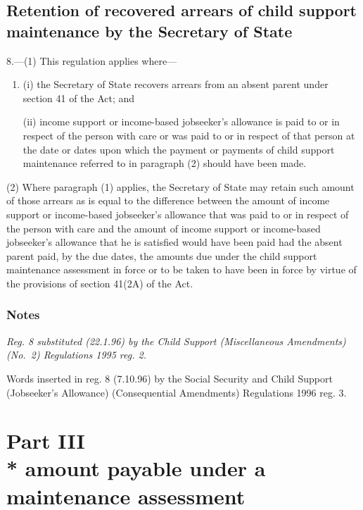 \documentclass[a4paper]{article}
\newcommand\amendment[1]{\subsubsection*{Notes}{\itshape\frenchspacing\footnotesize #1 \par}}
\begin{document}
\subsection[8. Retention of recovered arrears of child support maintenance by the Secretary of State]{Retention of recovered arrears of child support maintenance by the Secretary of State}

8.—(1) This regulation applies where—
\begin{enumerate}\item[]
(i) the Secretary of State recovers arrears from an absent parent under section 41 of the Act; and

(ii) income support
or income-based jobseeker’s allowance  %
is paid to or in respect of the person with care or was paid to or in respect of that person at the date or dates upon which the payment or payments of child support maintenance referred to in paragraph (2) should have been made.
\end{enumerate}

(2) Where paragraph (1) applies, the Secretary of State may retain such amount of those arrears as is equal to the difference between the amount of income support 
or income-based jobseeker’s allowance  %
that was paid to or in respect of the person with care and the amount of income support 
or income-based jobseeker’s allowance  %
that he is satisfied would have been paid had the absent parent paid, by the due dates, the amounts due under the child support maintenance assessment in force or to be taken to have been in force by virtue of the provisions of section 41(2A) of the Act.

\amendment{
Reg. 8 substituted (22.1.96) by the Child Support (Miscellaneous Amendments) (No.\ 2) Regulations 1995 reg. 2.

Words inserted in reg. 8 (7.10.96) by the Social Security and Child Support (Jobseeker's Allowance) (Consequential Amendments) Regulations 1996 reg. 3.

}

\section[Part III --- Attribution of payments and adjustment of the amount payable under a maintenance assessment]{\sloppy Part III\\* amount payable under a maintenance assessment}
\end{document}
